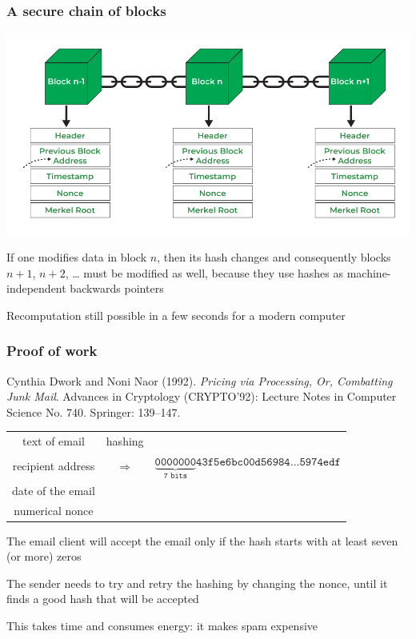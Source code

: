 \documentclass[11pt]{beamer}  %
\begin{document}
\begin{frame}\frametitle{A secure chain of blocks}

  \begin{center}
    \includegraphics[scale=0.26,clip=false]{pictures/blocks.png}
  \end{center}

  If one modifies data in block $n$, then its hash changes and consequently
  blocks $n+1$, $n+2$, \ldots
  must be modified as well, because they use hashes as machine-independent backwards pointers

  \medskip

  \begin{redbox}{}
    Recomputation still possible in a few seconds for a modern computer
  \end{redbox}
  
\end{frame}

\begin{frame}\frametitle{Proof of work}

  \begin{redbox}{}
    Cynthia Dwork and Noni Naor (1992). \emph{Pricing via Processing, Or, Combatting Junk Mail}. Advances in Cryptology (CRYPTO’92): Lecture Notes in Computer Science No. 740. Springer: 139–147.
  \end{redbox}

  \bigskip

  \begin{tabular}{ccc}
    text of email & hashing & \\
    recipient address & $\Rightarrow$ & $\mathtt{\underbrace{0000000}_{7\text{ bits}}43f5e6bc00d56984\ldots5974edf}$\\
    date of the email && \\
    numerical nonce &&
  \end{tabular}

  \bigskip

  The email client will accept the email only if the hash starts with at least seven (or more) zeros

  \bigskip

  The sender needs to try and retry the hashing by changing the nonce, until it finds a good hash that will be accepted

  \bigskip

  This takes time and consumes energy: it makes spam expensive

\end{frame}
\end{document}
